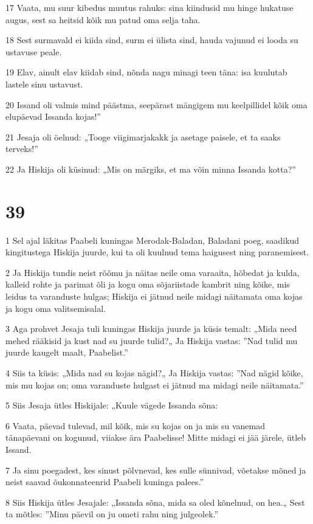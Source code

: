 \par 17 Vaata, mu suur kibedus muutus rahuks: sina kiindusid mu hinge hukatuse augus, sest sa heitsid kõik mu patud oma selja taha.
\par 18 Sest surmavald ei kiida sind, surm ei ülista sind, hauda vajunud ei looda su ustavuse peale.
\par 19 Elav, ainult elav kiidab sind, nõnda nagu minagi teen täna: isa kuulutab lastele sinu ustavust.
\par 20 Issand oli valmis mind päästma, seepärast mängigem mu keelpillidel kõik oma elupäevad Issanda kojas!”
\par 21 Jesaja oli öelnud: „Tooge viigimarjakakk ja asetage paisele, et ta saaks terveks!”
\par 22 Ja Hiskija oli küsinud: „Mis on märgiks, et ma võin minna Issanda kotta?”

\chapter{39}

\par 1 Sel ajal läkitas Paabeli kuningas Merodak-Baladan, Baladani poeg, saadikud kingitustega Hiskija juurde, kui ta oli kuulnud tema haigusest ning paranemisest.
\par 2 Ja Hiskija tundis neist rõõmu ja näitas neile oma varaaita, hõbedat ja kulda, kalleid rohte ja parimat õli ja kogu oma sõjariistade kambrit ning kõike, mis leidus ta varanduste hulgas; Hiskija ei jätnud neile midagi näitamata oma kojas ja kogu oma valitsemisalal.
\par 3 Aga prohvet Jesaja tuli kuningas Hiskija juurde ja küsis temalt: „Mida need mehed rääkisid ja kust nad su juurde tulid?„ Ja Hiskija vastas: ”Nad tulid mu juurde kaugelt maalt, Paabelist.”
\par 4 Siis ta küsis: „Mida nad su kojas nägid?„ Ja Hiskija vastas: ”Nad nägid kõike, mis mu kojas on; oma varanduste hulgast ei jätnud ma midagi neile näitamata.”
\par 5 Siis Jesaja ütles Hiskijale: „Kuule vägede Issanda sõna:
\par 6 Vaata, päevad tulevad, mil kõik, mis su kojas on ja mis su vanemad tänapäevani on kogunud, viiakse ära Paabelisse! Mitte midagi ei jää järele, ütleb Issand.
\par 7 Ja sinu poegadest, kes sinust põlvnevad, kes sulle sünnivad, võetakse mõned ja neist saavad õukonnateenrid Paabeli kuninga palees.”
\par 8 Siis Hiskija ütles Jesajale: „Issanda sõna, mida sa oled kõnelnud, on hea.„ Sest ta mõtles: ”Minu päevil on ju ometi rahu ning julgeolek.”

